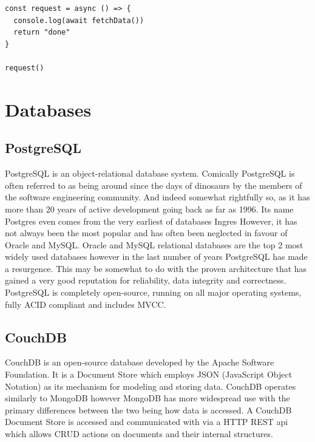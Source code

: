 \begin{verbatim}
const request = async () => {
  console.log(await fetchData())
  return "done"
}

request()
\end{verbatim}
\section{Databases}
\subsection{PostgreSQL}

PostgreSQL is an object-relational database system. Comically PostgreSQL is often referred to as being around since the days of dinosaurs by the members of the software engineering community. And indeed somewhat rightfully so, as it has more than 20 years of active development going back as far as 1996. Its name Postgres even comes from the very earliest of databases Ingres\cite{postgresguide} However, it has not always been the most popular and has often been neglected in favour of Oracle and MySQL. Oracle and MySQL relational databases are the top 2 most widely used databases\cite{dbrankings} however in the last number of years PostgreSQL has made a resurgence. This may be somewhat to do with the proven architecture that has gained a very good reputation for reliability, data integrity and correctness\cite{postgres}. PostgreSQL is completely open-source, running on all major operating systems, fully ACID compliant and includes MVCC\cite{postgres}.

\subsection{CouchDB}

CouchDB\cite{couchdb} is an open-source database developed by the Apache Software Foundation. It is a Document Store\cite{docStore} which employs JSON (JavaScript Object Notation) as its mechanism for modeling and storing data. CouchDB operates similarly to MongoDB however MongoDB has more widespread use\cite{dbranking} with the primary differences between the two being how data is accessed. A CouchDB Document Store is accessed and communicated with via a HTTP REST api\cite{couchapi} which allows CRUD actions on documents and their internal structures.

